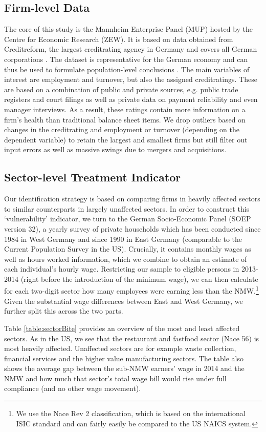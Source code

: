 \subsection{Firm-level Data}
The core of this study is the Mannheim Enterprise Panel (MUP) hosted by the Centre for Economic Research (ZEW). It is based on data obtained from Creditreform, the largest creditrating agency in Germany and covers all German corporations \citep{Steven2017}. The dataset is representative for the German economy and can thus be used to formulate population-level conclusions \citep{Bersch2014}. The main variables of interest are employment and turnover, but also the assigned creditratings. These are based on a combination of public and private sources, e.g. public trade registers and court filings as well as private data on payment reliability and even manager interviews. As a result, these ratings contain more information on a firm's health than traditional balance sheet items. We drop outliers based on changes in the creditrating and employment or turnover (depending on the dependent variable) to retain the largest and smallest firms but still filter out input errors as well as massive swings due to mergers and acquisitions.

\subsection{Sector-level Treatment Indicator}
Our identification strategy is based on comparing firms in heavily affected sectors to similar counterparts in largely unaffected sectors. In order to construct this `vulnerability' indicator, we turn to the German Socio-Economic Panel (SOEP version 32), a yearly survey of private households which has been conducted since 1984 in West Germany and since 1990 in East Germany (comparable to the Current Population Survey in the US). Crucially, it contains monthly wages as well as hours worked information, which we combine to obtain an estimate of each individual's hourly wage. Restricting our sample to eligible persons in 2013-2014 (right before the introduction of the minimum wage), we can then calculate for each two-digit sector how many employees were earning less than the NMW.\footnote{We use the Nace Rev 2 classification, which is based on the international ISIC standard and can fairly easily be compared to the US NAICS system.} Given the substantial wage differences between East and West Germany, we further split this across the two parts. 

Table \ref{table:sectorBite} provides an overview of the most and least affected sectors. As in the US, we see that the restaurant and fastfood sector (Nace 56) is most heavily affected. Unaffected sectors are for example waste collection, financial services and the higher value manufacturing sectors. The table also shows the average gap between the sub-NMW earners' wage in 2014 and the NMW and how much that sector's total wage bill would rise under full compliance (and no other wage movement).

